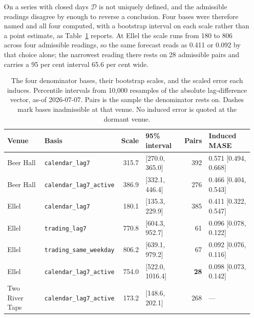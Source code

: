 On a series with closed days $\mathcal{D}$ is not uniquely defined, and the admissible readings
disagree by enough to reverse a conclusion. Four bases were therefore named and all four
computed, with a bootstrap interval on each scale rather than a point estimate, as
Table~\ref{tab:bases} reports. At Ellel the scale runs from 180 to 806 across four admissible
readings, so the same forecast reads as 0.411 or 0.092 by that choice alone; the narrowest
reading there rests on 28 admissible pairs and carries a 95 per cent interval 65.6 per cent wide.

\begin{table}[t]
\centering
\small
\caption[The four denominator bases, their bootstrap scales, and the scaled error each
induces]{The four denominator bases, their bootstrap scales, and the scaled error each induces.
Percentile intervals from 10,000 resamples of the absolute lag-difference vector, as-of
2026-07-07. Pairs is the sample the denominator rests on. Dashes mark bases inadmissible at that
venue. No induced error is quoted at the dormant venue.}
\label{tab:bases}
\begin{tabular}{llrlrl}
\toprule
Venue & Basis & Scale & 95\% interval & Pairs & Induced MASE \\
\midrule
Beer Hall & \texttt{calendar\_lag7}         & 315.7 & [270.0, 365.0]  & 392 & 0.571 [0.494, 0.668] \\
Beer Hall & \texttt{calendar\_lag7\_active} & 386.9 & [332.1, 446.4]  & 276 & 0.466 [0.404, 0.543] \\
\midrule
Ellel     & \texttt{calendar\_lag7}          & 180.1 & [135.3, 229.9]   & 385 & 0.411 [0.322, 0.547] \\
Ellel     & \texttt{trading\_lag7}           & 770.8 & [604.3, 952.7]   & 61  & 0.096 [0.078, 0.122] \\
Ellel     & \texttt{trading\_same\_weekday}  & 806.2 & [639.1, 979.2]   & 67  & 0.092 [0.076, 0.116] \\
Ellel     & \texttt{calendar\_lag7\_active}  & 754.0 & [522.0, 1016.4]  & \textbf{28} & 0.098 [0.073, 0.142] \\
\midrule
Two River Taps & \texttt{calendar\_lag7\_active} & 173.2 & [148.6, 202.1] & 268 & --- \\
\bottomrule
\end{tabular}
\end{table}

